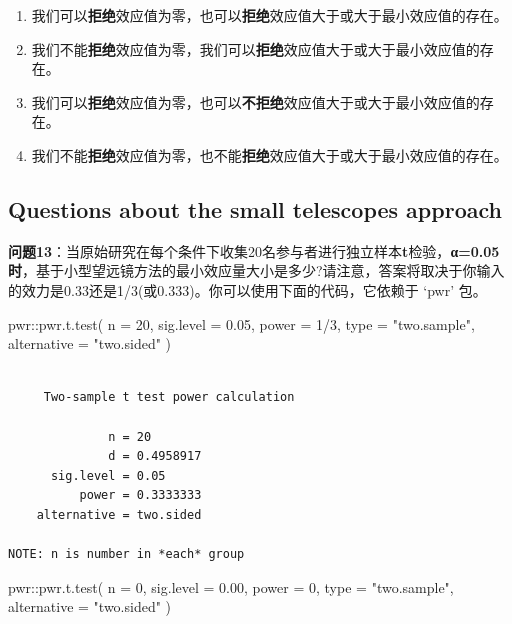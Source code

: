 \documentclass[
  letterpaper,
  DIV=11,
  numbers=noendperiod]{scrreprt}
\newenvironment{Shaded}{\begin{snugshade}}{\end{snugshade}}
\newcommand{\AttributeTok}[1]{\textcolor[rgb]{0.40,0.45,0.13}{#1}}
\newcommand{\DecValTok}[1]{\textcolor[rgb]{0.68,0.00,0.00}{#1}}
\newcommand{\FloatTok}[1]{\textcolor[rgb]{0.68,0.00,0.00}{#1}}
\newcommand{\FunctionTok}[1]{\textcolor[rgb]{0.28,0.35,0.67}{#1}}
\newcommand{\NormalTok}[1]{\textcolor[rgb]{0.00,0.23,0.31}{#1}}
\newcommand{\SpecialCharTok}[1]{\textcolor[rgb]{0.37,0.37,0.37}{#1}}
\newcommand{\StringTok}[1]{\textcolor[rgb]{0.13,0.47,0.30}{#1}}
\providecommand{\tightlist}{%
  \setlength{\itemsep}{0pt}\setlength{\parskip}{0pt}}\usepackage{longtable,booktabs,array}
\begin{document}
\begin{enumerate}
\def\labelenumi{\Alph{enumi})}
\tightlist
\item
  我们可以\textbf{拒绝}效应值为零，也可以\textbf{拒绝}效应值大于或大于最小效应值的存在。
\item
  我们不能\textbf{拒绝}效应值为零，我们可以\textbf{拒绝}效应值大于或大于最小效应值的存在。
\item
  我们可以\textbf{拒绝}效应值为零，也可以\textbf{不拒绝}效应值大于或大于最小效应值的存在。
\item
  我们不能\textbf{拒绝}效应值为零，也不能\textbf{拒绝}效应值大于或大于最小效应值的存在。
\end{enumerate}

\hypertarget{questions-about-the-small-telescopes-approach}{%
\subsection{Questions about the small telescopes
approach}\label{questions-about-the-small-telescopes-approach}}

\textbf{问题13}：当原始研究在每个条件下收集20名参与者进行独立样本\textbf{t}检验，\textbf{α=0.05时}，基于小型望远镜方法的最小效应量大小是多少?请注意，答案将取决于你输入的效力是0.33还是1/3(或0.333)。你可以使用下面的代码，它依赖于
`pwr' 包。

\begin{Shaded}
\begin{Highlighting}[]
\NormalTok{pwr}\SpecialCharTok{::}\FunctionTok{pwr.t.test}\NormalTok{(}
  \AttributeTok{n =} \DecValTok{20}\NormalTok{,}
  \AttributeTok{sig.level =} \FloatTok{0.05}\NormalTok{,}
  \AttributeTok{power =} \DecValTok{1}\SpecialCharTok{/}\DecValTok{3}\NormalTok{,}
  \AttributeTok{type =} \StringTok{"two.sample"}\NormalTok{,}
  \AttributeTok{alternative =} \StringTok{"two.sided"}
\NormalTok{)}
\end{Highlighting}
\end{Shaded}

\begin{verbatim}

     Two-sample t test power calculation 

              n = 20
              d = 0.4958917
      sig.level = 0.05
          power = 0.3333333
    alternative = two.sided

NOTE: n is number in *each* group
\end{verbatim}

\begin{Shaded}
\begin{Highlighting}[]
\NormalTok{pwr}\SpecialCharTok{::}\FunctionTok{pwr.t.test}\NormalTok{(}
  \AttributeTok{n =} \DecValTok{0}\NormalTok{, }
  \AttributeTok{sig.level =} \FloatTok{0.00}\NormalTok{, }
  \AttributeTok{power =} \DecValTok{0}\NormalTok{, }
  \AttributeTok{type =} \StringTok{"two.sample"}\NormalTok{,}
  \AttributeTok{alternative =} \StringTok{"two.sided"}
\NormalTok{)}
\end{Highlighting}
\end{Shaded}
\end{document}
